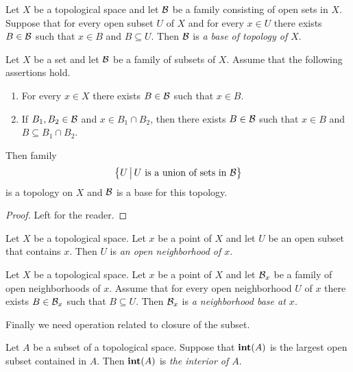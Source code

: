 \begin{definition}
	Let $X$ be a topological space and let ${\mathcal B}$ be a family consisting of open sets in $X$. Suppose that for every open subset $U$ of $X$ and for every $x \in U$ there exists $B \in {\mathcal B}$ such that $x \in B$ and $B \subseteq U$. Then ${\mathcal B}$ is \textit{a base of topology of $X$}.
\end{definition}

\begin{fact}\label{fact:bases_of_topology}
	Let $X$ be a set and let ${\mathcal B}$ be a family of subsets of $X$. Assume that the following assertions hold.
	\begin{enumerate}[label=\emph{\textbf{(\arabic*)}}, leftmargin=3.0em]
		\item For every $x \in X$ there exists $B \in {\mathcal B}$ such that $x \in B$.
		\item If $B_1,B_2 \in {\mathcal B}$ and $x \in B_1 \cap B_2$, then there exists $B \in {\mathcal B}$ such that $x\in B$ and $B \subseteq B_1 \cap B_2$.
	\end{enumerate}
	Then family
	$$\big\{U\,\big|\,U\mbox{ is a union of sets in }{\mathcal B}\big\}$$
	is a topology on $X$ and ${\mathcal B}$ is a base for this topology.
\end{fact}
\begin{proof}
	Left for the reader.
\end{proof}

\begin{definition}
	Let $X$ be a topological space. Let $x$ be a point of $X$ and let $U$ be an open subset that contains $x$. Then $U$ is \textit{an open neighborhood of $x$}.
\end{definition}

\begin{definition}
	Let $X$ be a topological space. Let $x$ be a point of $X$ and let ${\mathcal B}_x$ be a family of open neighborhoods of $x$. Assume that for every open neighborhood $U$ of $x$ there exists $B \in {\mathcal B}_x$ such that $B\subseteq U$. Then ${\mathcal B}_x$ is \textit{a neighborhood base at $x$}.
\end{definition}
\noindent
Finally we need operation related to closure of the subset.

\begin{definition}
	Let $A$ be a subset of a topological space. Suppose that $\mathbf{int}(A)$ is the largest open subset contained in $A$. Then $\mathbf{int}(A)$ is \textit{the interior of $A$}.
\end{definition}

